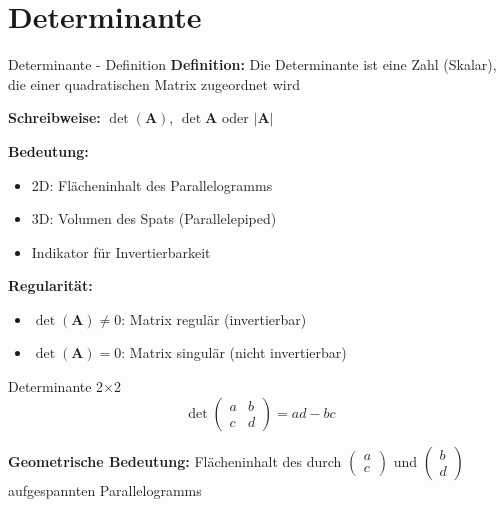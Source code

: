 \documentclass[a4paper, fontsize=7pt]{scrartcl}
\begin{document}
\section{Determinante}

\begin{mainbox}{Determinante - Definition}
\textbf{Definition:} Die Determinante ist eine Zahl (Skalar), die einer quadratischen Matrix zugeordnet wird

\textbf{Schreibweise:} $\det(\mathbf{A})$, $\det\mathbf{A}$ oder $|\mathbf{A}|$

\textbf{Bedeutung:}
\begin{itemize}
    \item 2D: Flächeninhalt des Parallelogramms
    \item 3D: Volumen des Spats (Parallelepiped)
    \item Indikator für Invertierbarkeit
\end{itemize}

\textbf{Regularität:}
\begin{itemize}
    \item $\det(\mathbf{A}) \neq 0$: Matrix regulär (invertierbar)
    \item $\det(\mathbf{A}) = 0$: Matrix singulär (nicht invertierbar)
\end{itemize}
\end{mainbox}

\begin{mainbox}{Determinante 2×2}
$$\det\begin{pmatrix} a & b \\ c & d \end{pmatrix} = ad - bc$$

\textbf{Geometrische Bedeutung:} Flächeninhalt des durch $\begin{pmatrix} a \\ c \end{pmatrix}$ und $\begin{pmatrix} b \\ d \end{pmatrix}$ aufgespannten Parallelogramms
\end{mainbox}
\end{document}

